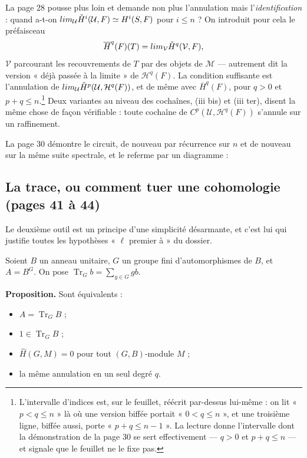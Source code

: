 \documentclass[11pt,a4paper]{article}
\begin{document}
La page 28 pousse plus loin et demande non plus l'annulation mais
l'\emph{identification} : quand a-t-on
$\varinjlim_{\mathcal{U}} \check{H}^i(\mathcal{U},F) \simeq H^i(S,F)$ pour
$i \leqslant n$ ? On introduit pour cela le préfaisceau
\[
\overline{H}^q(F)(T) = \varinjlim_{\mathcal{V}}
\check{H}^q(\mathcal{V}, F),
\]
$\mathcal{V}$ parcourant les recouvrements de $T$ par des objets de
$\mathcal{M}$ — autrement dit la version « déjà passée à la limite » de
$\mathcal{H}^q(F)$. La condition suffisante est l'annulation de
$\varinjlim_{\mathcal{U}} \check{H}^p(\mathcal{U}, \mathcal{H}^q(F))$, et de
même avec $\overline{H}^q(F)$, pour $q > 0$ et $p+q \leqslant
n$.\footnote{L'intervalle d'indices est, sur le feuillet, réécrit par-dessus
lui-même : on lit « $p < q \leqslant n$ » là où une version biffée portait
« $0 < q \leqslant n$ », et une troisième ligne, biffée aussi, porte
« $p + q \leqslant n-1$ ». La lecture donne l'intervalle dont la démonstration
de la page 30 se sert effectivement — $q > 0$ et $p+q \leqslant n$ — et signale
que le feuillet ne le fixe pas.} Deux variantes au niveau des cochaînes, (iii
bis) et (iii ter), disent la même chose de façon vérifiable : toute cochaîne de
$C^p(\mathcal{U}, \mathcal{H}^q(F))$ s'annule sur un raffinement.

La page 30 démontre le circuit, de nouveau par récurrence sur $n$ et de nouveau
sur la même suite spectrale, et le referme par un diagramme :


\subsection*{La trace, ou comment tuer une cohomologie (pages 41 à 44)}

Le deuxième outil est un principe d'une simplicité désarmante, et c'est lui qui
justifie toutes les hypothèses « $\ell$ premier à » du dossier.

Soient $B$ un anneau unitaire, $G$ un groupe fini d'automorphismes de $B$, et
$A = B^G$. On pose $\operatorname{Tr}_G b = \sum_{g \in G} gb$.

\textbf{Proposition.} Sont équivalents :
\begin{itemize}
\item[a)] $A = \operatorname{Tr}_G B$ ;
\item[a$'$)] $1 \in \operatorname{Tr}_G B$ ;
\item[b)] $\widehat{H}(G,M) = 0$ pour tout $(G,B)$-module $M$ ;
\item[b($q$))] la même annulation en un seul degré $q$.
\end{itemize}
\end{document}
